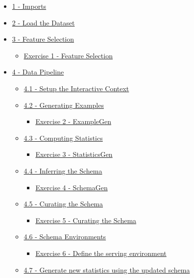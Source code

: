\documentclass[11pt]{article}
\providecommand{\tightlist}{%
      \setlength{\itemsep}{0pt}\setlength{\parskip}{0pt}}
\begin{document}
\begin{itemize}
\tightlist
\item
  \hyperref[1]{1 - Imports}
\item
  \hyperref[2]{2 - Load the Dataset}
\item
  \hyperref[4]{3 - Feature Selection}

  \begin{itemize}
  \tightlist
  \item
    \hyperref[ex-1]{Exercise 1 - Feature Selection}
  \end{itemize}
\item
  \hyperref[4]{4 - Data Pipeline}

  \begin{itemize}
  \tightlist
  \item
    \hyperref[4-1]{4.1 - Setup the Interactive Context}
  \item
    \hyperref[4-2]{4.2 - Generating Examples}

    \begin{itemize}
    \tightlist
    \item
      \hyperref[ex-2]{Exercise 2 - ExampleGen}
    \end{itemize}
  \item
    \hyperref[4-3]{4.3 - Computing Statistics}

    \begin{itemize}
    \tightlist
    \item
      \hyperref[ex-3]{Exercise 3 - StatisticsGen}
    \end{itemize}
  \item
    \hyperref[4-4]{4.4 - Inferring the Schema}

    \begin{itemize}
    \tightlist
    \item
      \hyperref[ex-4]{Exercise 4 - SchemaGen}
    \end{itemize}
  \item
    \hyperref[4-5]{4.5 - Curating the Schema}

    \begin{itemize}
    \tightlist
    \item
      \hyperref[ex-5]{Exercise 5 - Curating the Schema}
    \end{itemize}
  \item
    \hyperref[4-6]{4.6 - Schema Environments}

    \begin{itemize}
    \tightlist
    \item
      \hyperref[ex-6]{Exercise 6 - Define the serving environment}
    \end{itemize}
  \item
    \hyperref[4-7]{4.7 - Generate new statistics using the updated schema}


\end{itemize}
\end{itemize}
\end{document}
